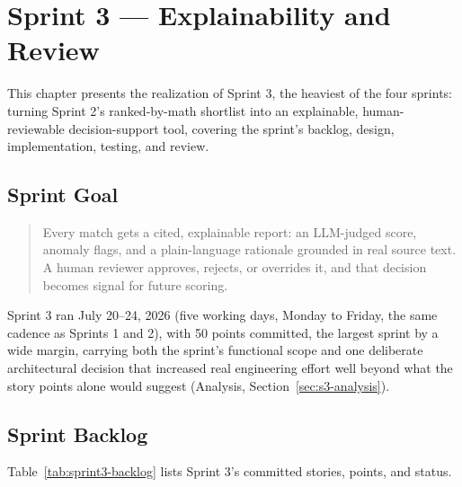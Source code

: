 \chapter{Sprint 3 --- Explainability and Review}
\label{chap:sprint-3}

This chapter presents the realization of Sprint 3, the heaviest of the
four sprints: turning Sprint 2's ranked-by-math shortlist into an
explainable, human-reviewable decision-support tool, covering the
sprint's backlog, design, implementation, testing, and review.

\section{Sprint Goal}

\begin{quote}
Every match gets a cited, explainable report: an LLM-judged score,
anomaly flags, and a plain-language rationale grounded in real source
text. A human reviewer approves, rejects, or overrides it, and that
decision becomes signal for future scoring.
\end{quote}

Sprint 3 ran July 20--24, 2026 (five working days, Monday to Friday,
the same cadence as Sprints 1 and 2), with 50 points committed, the
largest sprint by a wide margin, carrying both the sprint's functional
scope and one deliberate architectural decision that increased real
engineering effort well beyond what the story points alone would
suggest (Analysis, Section~\ref{sec:s3-analysis}).

\section{Sprint Backlog}

Table~\ref{tab:sprint3-backlog} lists Sprint 3's committed stories, points, and status.

